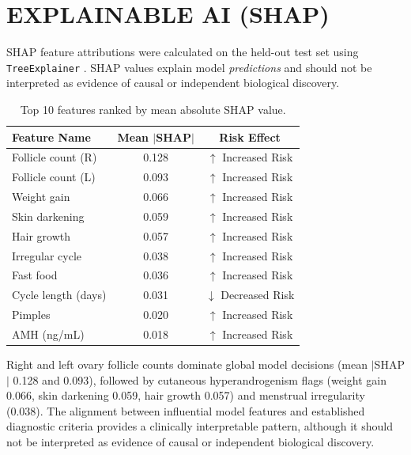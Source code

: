 \documentclass[10pt,twocolumn,a4paper]{article}
\begin{document}
\section{EXPLAINABLE AI (SHAP)}

SHAP feature attributions were calculated on the held-out test set using \texttt{TreeExplainer} \cite{lundberg2017shap}.
SHAP values explain model \emph{predictions} and should not be interpreted as evidence of causal or independent biological discovery.

\begin{table}[htbp]
\centering
\caption{Top 10 features ranked by mean absolute SHAP value.}
\label{tab:shap}
\vspace{2pt}
\setlength{\tabcolsep}{3.5pt}
\small
\begin{tabular}{@{}l c c@{}}
\toprule
Feature Name & Mean $|$SHAP$|$ & Risk Effect \\
\midrule
Follicle count (R) & 0.128 & $\uparrow$ Increased Risk \\
Follicle count (L) & 0.093 & $\uparrow$ Increased Risk \\
Weight gain        & 0.066 & $\uparrow$ Increased Risk \\
Skin darkening     & 0.059 & $\uparrow$ Increased Risk \\
Hair growth        & 0.057 & $\uparrow$ Increased Risk \\
Irregular cycle    & 0.038 & $\uparrow$ Increased Risk \\
Fast food          & 0.036 & $\uparrow$ Increased Risk \\
Cycle length (days)& 0.031 & $\downarrow$ Decreased Risk \\
Pimples            & 0.020 & $\uparrow$ Increased Risk \\
AMH (ng/mL)        & 0.018 & $\uparrow$ Increased Risk \\
\bottomrule
\end{tabular}
\end{table}

Right and left ovary follicle counts dominate global model decisions (mean $|$SHAP$|$ 0.128 and 0.093), followed by cutaneous hyperandrogenism flags
(weight gain 0.066, skin darkening 0.059, hair growth 0.057) and menstrual irregularity (0.038).
The alignment between influential model features and established diagnostic criteria provides a clinically interpretable pattern, although it should not
be interpreted as evidence of causal or independent biological discovery.
\end{document}
